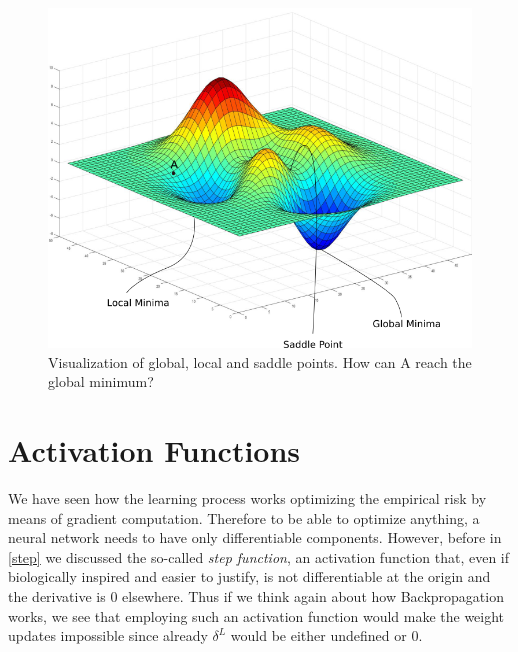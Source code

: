 \documentclass[LaM,binding=0.6cm]{./packages/sapthesis/sapthesis}
\begin{document}
            \begin{figure}[h]
                \centering
                \includegraphics[scale=0.35]{globlocsad}
                \caption{Visualization of global, local and saddle points. How can A reach the global minimum?}
                \label{fig:globlocsad}
            \end{figure}

        \section{Activation Functions}
            
            We have seen how the learning process works optimizing the empirical risk by means of gradient computation.
            Therefore to be able to optimize anything, a neural network needs to have only differentiable components.
            However, before in \ref{step} we discussed the so-called \textit{step function}, an activation function that, 
            even if biologically inspired and easier to justify, is not differentiable at the origin and the derivative is 0 elsewhere.
            Thus if we think again about how Backpropagation works, we see that employing such an activation function would make the weight updates impossible
            since already $ \delta^{L} $ would be either undefined or 0.
\end{document}
